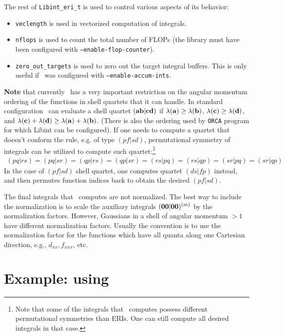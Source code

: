 \documentclass[12pt]{article}
\begin{document}
The rest of {\tt Libint\_eri\_t} is used to control various aspects of its behavior:
\begin{itemize}
\item {\tt veclength} is used in vectorized computation of integrals.
\item {\tt nflops} is used to count the total number of FLOPs (the library must have been configured
  with {\tt --enable-flop-counter}).
\item {\tt zero\_out\_targets} is used to zero out the target integral buffers. This is only useful
  if \LIBINT\ was configured with {\tt --enable-accum-ints}.
\end{itemize}

{\bf Note} that currently \LIBINT\ has a very important restriction on the angular momentum ordering of the functions
in shell quartets that it can handle. In standard configuration \LIBINT\ can
evaluate a shell quartet $({\bf ab}|{\bf cd})$ if $\lambda({\bf a}) \geq \lambda({\bf b})$,
$\lambda({\bf c}) \geq \lambda({\bf d})$, and $\lambda({\bf c}) + \lambda({\bf d}) \geq \lambda({\bf a}) + \lambda({\bf b})$.
(There is also the ordering used by {\tt ORCA} program for which Libint can be
configured). If one needs to compute a quartet that doesn't conform the rule,
e.g. of type $(pf|sd)$, permutational symmetry of integrals can be utilized to compute such quartet:\footnote{Note that some
of the integrals that \librij\ computes possess different permutational symmetries than ERIs. One can still
compute all desired integrals in that case.}
\begin{eqnarray}
(pq|rs) = (pq|sr) = (qp|rs) = (qp|sr) = (rs|pq) = (rs|qp)= (sr|pq) = (sr|qp)
\end{eqnarray}
In the case of $(pf|sd)$ shell quartet, one computes quartet $(ds|fp)$ instead, and then
permutes function indices back to obtain the desired $(pf|sd)$.

The final integrals that \LIBINT\ computes are not normalized. The best way to include the normalization
is to scale the auxiliary integrals $({\bf 00}|{\bf 00})^{(m)}$ by the normalization factors.
However, Gaussians in a shell of angular momentum $>1$ have different normalization factors.
Usually the convention is to use the normalization factor for the functions which have all quanta along
one Cartesian direction, e.g., $d_{xx}, f_{xxx}$, etc.

\section{Example: using \libint}
\end{document}
